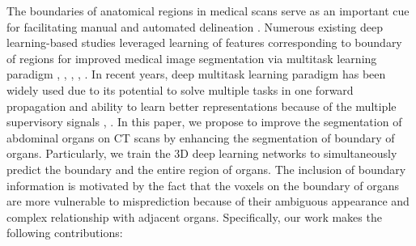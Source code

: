 \documentclass[final,5p,times,twocolumn]{elsarticle}
\begin{document}
The boundaries of anatomical regions in medical scans serve as an important cue for facilitating manual and automated delineation \cite{Guo2021}. Numerous existing deep learning-based studies leveraged learning of features corresponding to boundary of regions for improved medical image segmentation via multitask learning paradigm \cite{chen2016dcan}, \cite{8363791}, \cite{8906008}, \cite{9313420}, \cite{MEI2020101988}. In recent years, deep multitask learning paradigm has been widely used due to its potential to solve multiple tasks in one forward propagation and ability to learn better representations because of the multiple supervisory signals \cite{Amyar2020MultitaskDL}, \cite{Du2019CrossInfoNetMI}. In this paper, we propose to improve the segmentation of abdominal organs on CT scans by enhancing the segmentation of boundary of organs. Particularly, we train the 3D deep learning networks to simultaneously predict the boundary and the entire region of organs. The inclusion of boundary information is motivated by the fact that the voxels on the boundary of organs are more vulnerable to misprediction because of their ambiguous appearance and complex relationship with adjacent organs. Specifically, our work makes the following contributions:
\end{document}

